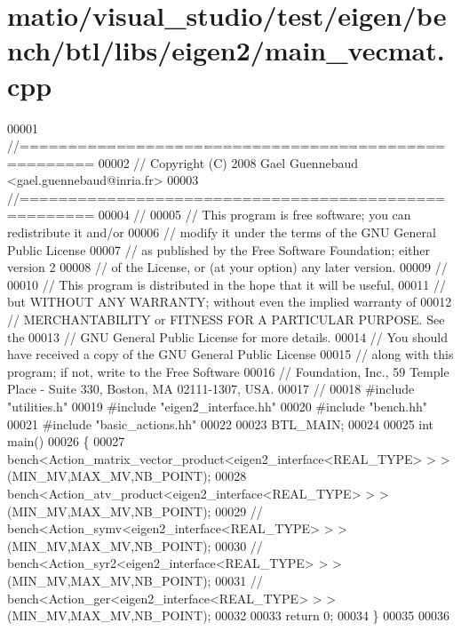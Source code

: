 \hypertarget{matio_2visual__studio_2test_2eigen_2bench_2btl_2libs_2eigen2_2main__vecmat_8cpp_source}{}\section{matio/visual\+\_\+studio/test/eigen/bench/btl/libs/eigen2/main\+\_\+vecmat.cpp}
\label{matio_2visual__studio_2test_2eigen_2bench_2btl_2libs_2eigen2_2main__vecmat_8cpp_source}

\begin{DoxyCode}
00001 \textcolor{comment}{//=====================================================}
00002 \textcolor{comment}{// Copyright (C) 2008 Gael Guennebaud <gael.guennebaud@inria.fr>}
00003 \textcolor{comment}{//=====================================================}
00004 \textcolor{comment}{//}
00005 \textcolor{comment}{// This program is free software; you can redistribute it and/or}
00006 \textcolor{comment}{// modify it under the terms of the GNU General Public License}
00007 \textcolor{comment}{// as published by the Free Software Foundation; either version 2}
00008 \textcolor{comment}{// of the License, or (at your option) any later version.}
00009 \textcolor{comment}{//}
00010 \textcolor{comment}{// This program is distributed in the hope that it will be useful,}
00011 \textcolor{comment}{// but WITHOUT ANY WARRANTY; without even the implied warranty of}
00012 \textcolor{comment}{// MERCHANTABILITY or FITNESS FOR A PARTICULAR PURPOSE.  See the}
00013 \textcolor{comment}{// GNU General Public License for more details.}
00014 \textcolor{comment}{// You should have received a copy of the GNU General Public License}
00015 \textcolor{comment}{// along with this program; if not, write to the Free Software}
00016 \textcolor{comment}{// Foundation, Inc., 59 Temple Place - Suite 330, Boston, MA  02111-1307, USA.}
00017 \textcolor{comment}{//}
00018 \textcolor{preprocessor}{#include "utilities.h"}
00019 \textcolor{preprocessor}{#include "eigen2\_interface.hh"}
00020 \textcolor{preprocessor}{#include "bench.hh"}
00021 \textcolor{preprocessor}{#include "basic\_actions.hh"}
00022 
00023 BTL\_MAIN;
00024 
00025 \textcolor{keywordtype}{int} main()
00026 \{
00027   bench<Action\_matrix\_vector\_product<eigen2\_interface<REAL\_TYPE> > >(MIN\_MV,MAX\_MV,NB\_POINT);
00028   bench<Action\_atv\_product<eigen2\_interface<REAL\_TYPE> > >(MIN\_MV,MAX\_MV,NB\_POINT);
00029 \textcolor{comment}{//   bench<Action\_symv<eigen2\_interface<REAL\_TYPE> > >(MIN\_MV,MAX\_MV,NB\_POINT);}
00030 \textcolor{comment}{//   bench<Action\_syr2<eigen2\_interface<REAL\_TYPE> > >(MIN\_MV,MAX\_MV,NB\_POINT);}
00031 \textcolor{comment}{//   bench<Action\_ger<eigen2\_interface<REAL\_TYPE> > >(MIN\_MV,MAX\_MV,NB\_POINT);}
00032 
00033   \textcolor{keywordflow}{return} 0;
00034 \}
00035 
00036 
\end{DoxyCode}
